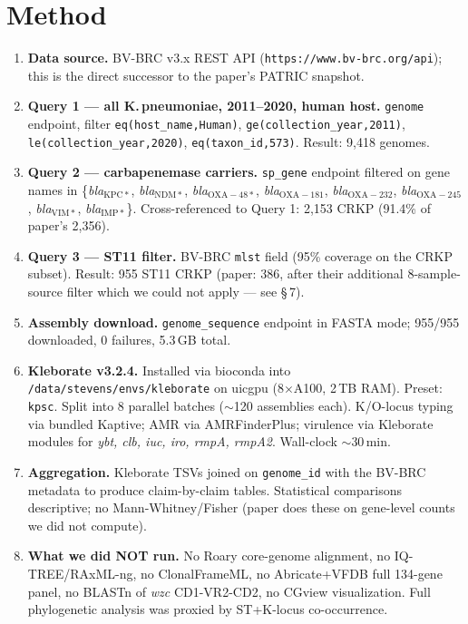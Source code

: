\documentclass[11pt]{article}
\begin{document}
\section{Method}
\begin{enumerate}[leftmargin=*, itemsep=2pt]
  \item \textbf{Data source.} BV-BRC v3.x REST API
    (\texttt{https://www.bv-brc.org/api}); this is the direct successor to the paper's
    PATRIC snapshot.
  \item \textbf{Query 1 --- all K.\,pneumoniae, 2011--2020, human host.}
    \texttt{genome} endpoint, filter \texttt{eq(host\_name,Human)},
    \texttt{ge(collection\_year,2011)}, \texttt{le(collection\_year,2020)},
    \texttt{eq(taxon\_id,573)}. Result: 9{,}418 genomes.
  \item \textbf{Query 2 --- carbapenemase carriers.} \texttt{sp\_gene} endpoint filtered
    on gene names in
    \{\emph{bla}$_{\mathrm{KPC*}}$, \emph{bla}$_{\mathrm{NDM*}}$, \emph{bla}$_{\mathrm{OXA-48*}}$,
    \emph{bla}$_{\mathrm{OXA-181}}$, \emph{bla}$_{\mathrm{OXA-232}}$,
    \emph{bla}$_{\mathrm{OXA-245}}$, \emph{bla}$_{\mathrm{VIM*}}$, \emph{bla}$_{\mathrm{IMP*}}$\}.
    Cross-referenced to Query 1: 2{,}153 CRKP (91.4\% of paper's 2{,}356).
  \item \textbf{Query 3 --- ST11 filter.} BV-BRC \texttt{mlst} field
    (95\% coverage on the CRKP subset). Result: 955 ST11 CRKP (paper: 386, after their
    additional 8-sample-source filter which we could not apply — see \S\,7).
  \item \textbf{Assembly download.} \texttt{genome\_sequence} endpoint in FASTA mode; 955/955
    downloaded, 0 failures, 5.3\,GB total.
  \item \textbf{Kleborate v3.2.4.} Installed via bioconda into \texttt{/data/stevens/envs/kleborate}
    on uicgpu (8$\times$A100, 2\,TB RAM). Preset: \texttt{kpsc}. Split into 8 parallel batches
    ($\sim$120 assemblies each). K/O-locus typing via bundled Kaptive; AMR via AMRFinderPlus;
    virulence via Kleborate modules for \emph{ybt, clb, iuc, iro, rmpA, rmpA2}. Wall-clock
    $\sim$30\,min.
  \item \textbf{Aggregation.} Kleborate TSVs joined on \texttt{genome\_id} with the BV-BRC
    metadata to produce claim-by-claim tables. Statistical comparisons descriptive; no
    Mann-Whitney/Fisher (paper does these on gene-level counts we did not compute).
  \item \textbf{What we did NOT run.} No Roary core-genome alignment, no IQ-TREE/RAxML-ng,
    no ClonalFrameML, no Abricate+VFDB full 134-gene panel, no BLASTn of \emph{wzc}
    CD1-VR2-CD2, no CGview visualization. Full phylogenetic analysis was proxied by
    ST+K-locus co-occurrence.
\end{enumerate}
\end{document}
